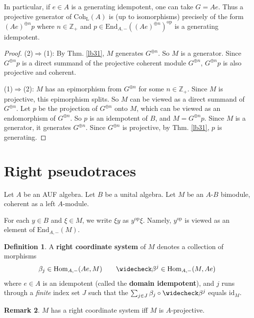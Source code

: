 \documentclass[11pt,b5paper,notitlepage]{article}
\theoremstyle{definition}
\newtheorem{df}{Definition}[section]
\newtheorem{rem}[df]{Remark}
\theoremstyle{plain}
\newcommand{\wch}{\widecheck}
\newcommand{\End}{\mathrm{End}} %
\newcommand{\id}{\mathrm{id}}
\newcommand{\Hom}{\mathrm{Hom}}
\newcommand{\opp}{\mathrm{op}}
\newcommand{\Zbb}{\mathbb Z}
\newcommand{\Coh}{\mathrm{Coh}_{\mathrm L}}
\numberwithin{equation}{section}
\begin{document}
In particular, if $e\in A$ is a generating idempotent, one can take $G=Ae$. Thus a projective generator of $\Coh(A)$ is (up to isomorphisms) precisely of the form $(Ae)^{\oplus n}p$ where $n\in\Zbb_+$ and $p\in \End_{A,-}((Ae)^{\oplus n})^\opp$
is a generating idempotent.

\begin{proof}
(2)$\Rightarrow$(1): By Thm. \ref{lb31}, $M$ generates $G^{\oplus n}$. So $M$ is a generator. Since $G^{\oplus n}p$ is a direct summand of the projective coherent module $G^{\oplus n}$, $G^{\oplus n}p$ is also projective and coherent.

(1)$\Rightarrow$(2): $M$ has an epimorphism from $G^{\oplus n}$ for some $n\in\Zbb_+$. Since $M$ is projective, this epimorphism splits. So $M$ can be viewed as a direct summand of $G^{\oplus n}$. Let $p$ be the projection of $G^{\oplus n}$ onto $M$, which can be viewed as an endomorphism of $G^{\oplus n}$. So $p$ is an idempotent of $B$, and $M=G^{\oplus n}p$. Since $M$ is a generator, it generates $G^{\oplus n}$. Since $G^{\oplus n}$ is projective, by Thm. \ref{lb31}, $p$ is generating.
\end{proof}










\section{Right pseudotraces}


Let $A$ be an AUF algebra. Let $B$ be a unital algebra. Let $M$ be an $A$-$B$ bimodule, coherent as a left $A$-module. 

For each $y\in B$ and $\xi\in M$, we write $\xi y$ as $y^\opp \xi$. Namely, $y^\opp$ is viewed as an element of $\End_{A,-}(M)$.

\begin{df}\label{lb36}
A \textbf{right coordinate system} of $M$ denotes a collection of morphisms
\begin{align*}
\beta_j\in\Hom_{A,-}(Ae,M)\qquad \wch\beta^j\in \Hom_{A,-}(M,Ae)
\end{align*}
where $e\in A$ is an idempotent (called the \textbf{domain idempotent}), and $j$ runs through a \textit{finite} index set $J$ such that the $\sum_{j\in J}\beta_j\circ\wch\beta^j$ equals $\id_M$.
\end{df}


\begin{rem}\label{lb38}
	$M$ has a right coordinate system iff $M$ is $A$-projective.
\end{rem}
\end{document}
